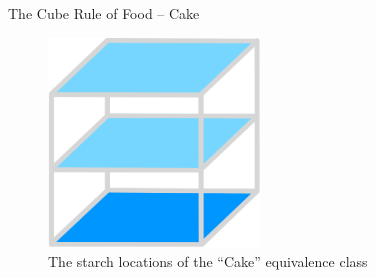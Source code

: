 \documentclass{beamer}
\begin{document}
\begin{frame}{The Cube Rule of Food -- Cake}
    \begin{figure}
        \includegraphics[width=0.5\textwidth]{cake/32_cake.png}
        \caption{\label{fig:cake-diagram}The starch locations of the ``Cake'' equivalence class}
    \end{figure}
\end{frame}
\end{document}
